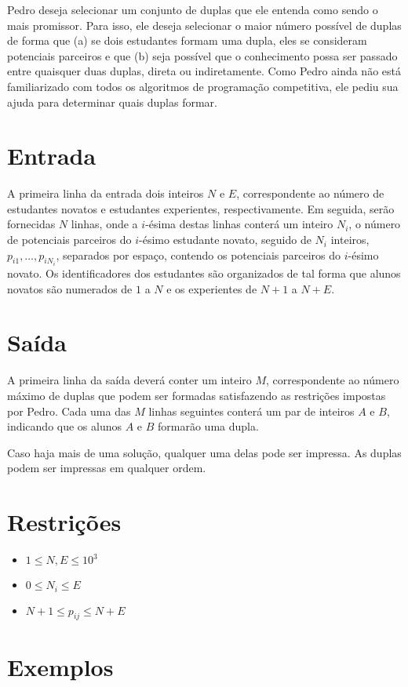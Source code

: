 Pedro deseja selecionar um conjunto de duplas que ele entenda como sendo o mais promissor. Para isso, ele deseja selecionar o maior número possível
de duplas de forma que (a) se dois estudantes formam uma dupla, eles se consideram potenciais parceiros e que (b) seja possível que o conhecimento
possa ser passado entre quaisquer duas duplas, direta ou indiretamente. Como Pedro ainda não está familiarizado com todos os algoritmos de programação
competitiva, ele pediu sua ajuda para determinar quais duplas formar.



\section*{Entrada}

A primeira linha da entrada dois inteiros $N$ e $E$, correspondente ao número de estudantes novatos e estudantes experientes, respectivamente.
Em seguida, serão fornecidas $N$ linhas, onde a $i$-ésima destas linhas conterá um inteiro $N_i$, o número de potenciais parceiros do $i$-ésimo
estudante novato, seguido de $N_i$ inteiros, $p_{i1}, \ldots, p_{iN_i}$, separados por espaço, contendo os potenciais parceiros do $i$-ésimo novato.
Os identificadores dos estudantes são organizados de tal forma que alunos novatos são numerados de $1$ a $N$ e os experientes de $N + 1$ a $N + E$.


\section*{Saída}

A primeira linha da saída deverá conter um inteiro $M$, correspondente ao número máximo de duplas que podem ser formadas satisfazendo as restrições
impostas por Pedro. Cada uma das $M$ linhas seguintes conterá um par de inteiros $A$ e $B$, indicando que os alunos $A$ e $B$ formarão uma dupla. 

Caso haja mais de uma solução, qualquer uma delas pode ser impressa. As duplas podem ser impressas em qualquer ordem. 

\section*{Restrições}

\begin{itemize}
    \item $1 \leq N,E \leq 10^{3}$
    \item $0 \leq N_i \leq E$
    \item $N+1 \leq p_{ij} \leq N+E$
\end{itemize}


\section*{Exemplos}

\exemplo